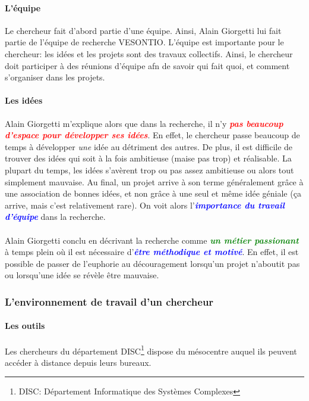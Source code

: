 \documentclass[a4paper,12pt, draft]{report}
\newcommand{\goodPoint}[1]{\textcolor{green}{\textbf{\textit{#1}}}}
\newcommand{\badPoint}[1]{\textcolor{red}{\textbf{\textit{#1}}}}
\newcommand{\importantPoint}[1]{\textcolor{blue}{\textbf{\textit{#1}}}}
\begin{document}
\paragraph{L'équipe}
Le chercheur fait d'abord partie d'une équipe. Ainsi, Alain Giorgetti lui fait partie de l'équipe de recherche VESONTIO. L'équipe est importante pour le chercheur: les idées et les projets sont des travaux collectifs. Ainsi, le chercheur doit participer à des réunions d'équipe afn de savoir qui fait quoi, et comment s'organiser dans les projets.

\paragraph{Les idées}
Alain Giorgetti m'explique alors que dans la recherche, il n'y \badPoint{pas beaucoup d'espace pour développer ses idées}. En effet, le chercheur passe beaucoup de temps à développer \textit{une} idée au détriment des autres.
De plus, il est difficile de trouver des idées qui soit à la fois ambitieuse (maise pas trop) et réalisable. La plupart du temps, les idées s'avèrent trop ou pas assez ambitieuse ou alors tout simplement mauvaise. Au final, un projet arrive à son terme généralement grâce à une association de bonnes idées, et non grâce à une seul et même idée géniale (ça arrive, mais c'est relativement rare).
On voit alors l'\importantPoint{importance du travail d'équipe} dans la recherche.

\paragraph{}
Alain Giorgetti conclu en décrivant la recherche comme \goodPoint{un métier passionant} à temps plein où il est nécessaire d'\importantPoint{être méthodique et motivé}. En effet, il est possible de passer de l'euphorie au découragement lorsqu'un projet n'aboutit pas ou lorsqu'une idée se révèle être mauvaise.


\subsubsection{L'environnement de travail d'un chercheur}
\paragraph{Les outils}
Les chercheurs du département DISC\footnote{\textsc{DISC}: Département Informatique des Systèmes Complexes} dispose du mésocentre auquel ils peuvent accéder à distance depuis leurs bureaux.
\end{document}
